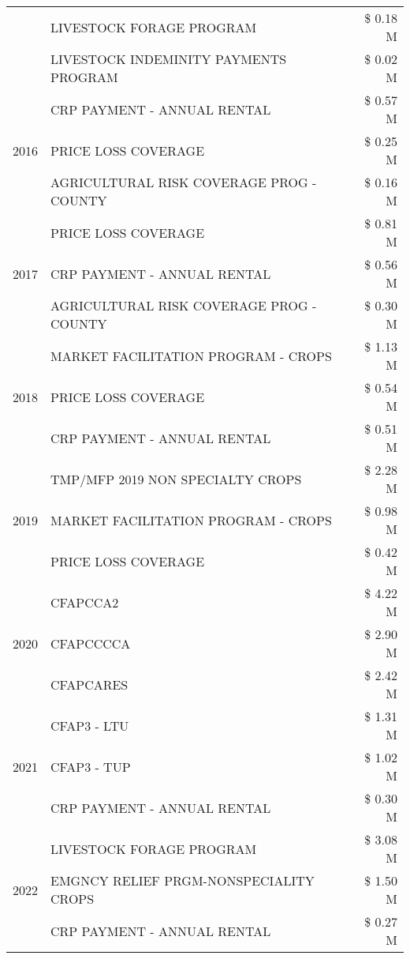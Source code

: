 \begin{tabular}{llr}
 & LIVESTOCK FORAGE PROGRAM & \$ 0.18 M \\
 & LIVESTOCK INDEMINITY PAYMENTS PROGRAM & \$ 0.02 M \\
\cline{1-3}
\multirow[t]{3}{*}{2016} & CRP PAYMENT - ANNUAL RENTAL & \$ 0.57 M \\
 & PRICE LOSS COVERAGE & \$ 0.25 M \\
 & AGRICULTURAL RISK COVERAGE PROG - COUNTY & \$ 0.16 M \\
\cline{1-3}
\multirow[t]{3}{*}{2017} & PRICE LOSS COVERAGE & \$ 0.81 M \\
 & CRP PAYMENT - ANNUAL RENTAL & \$ 0.56 M \\
 & AGRICULTURAL RISK COVERAGE PROG - COUNTY & \$ 0.30 M \\
\cline{1-3}
\multirow[t]{3}{*}{2018} & MARKET FACILITATION PROGRAM - CROPS & \$ 1.13 M \\
 & PRICE LOSS COVERAGE & \$ 0.54 M \\
 & CRP PAYMENT - ANNUAL RENTAL & \$ 0.51 M \\
\cline{1-3}
\multirow[t]{3}{*}{2019} & TMP/MFP 2019 NON SPECIALTY CROPS & \$ 2.28 M \\
 & MARKET FACILITATION PROGRAM - CROPS & \$ 0.98 M \\
 & PRICE LOSS COVERAGE & \$ 0.42 M \\
\cline{1-3}
\multirow[t]{3}{*}{2020} & CFAPCCA2 & \$ 4.22 M \\
 & CFAPCCCCA & \$ 2.90 M \\
 & CFAPCARES & \$ 2.42 M \\
\cline{1-3}
\multirow[t]{3}{*}{2021} & CFAP3 - LTU & \$ 1.31 M \\
 & CFAP3 - TUP & \$ 1.02 M \\
 & CRP PAYMENT - ANNUAL RENTAL & \$ 0.30 M \\
\cline{1-3}
\multirow[t]{3}{*}{2022} & LIVESTOCK FORAGE PROGRAM & \$ 3.08 M \\
 & EMGNCY RELIEF PRGM-NONSPECIALITY CROPS & \$ 1.50 M \\
 & CRP PAYMENT - ANNUAL RENTAL & \$ 0.27 M \\
\cline{1-3}
\bottomrule
\end{tabular}
